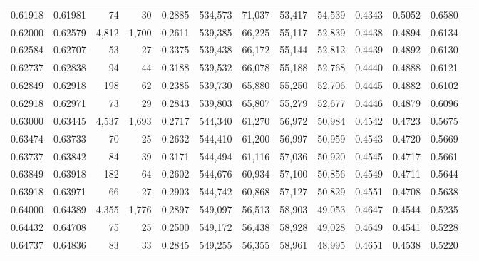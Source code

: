 \begin{tabular}{rrrrrrrrrrrrr}
0.61918 & 0.61981 &     74 &    30 &                                     0.2885 & 534,573 &  71,037 &  53,417 &  54,539 & 0.4343 & 0.5052 & 0.6580 \\
0.62000 & 0.62579 &  4,812 & 1,700 &                                     0.2611 & 539,385 &  66,225 &  55,117 &  52,839 & 0.4438 & 0.4894 & 0.6134 \\
0.62584 & 0.62707 &     53 &    27 &                                     0.3375 & 539,438 &  66,172 &  55,144 &  52,812 & 0.4439 & 0.4892 & 0.6130 \\
0.62737 & 0.62838 &     94 &    44 &                                     0.3188 & 539,532 &  66,078 &  55,188 &  52,768 & 0.4440 & 0.4888 & 0.6121 \\
0.62849 & 0.62918 &    198 &    62 &                                     0.2385 & 539,730 &  65,880 &  55,250 &  52,706 & 0.4445 & 0.4882 & 0.6102 \\
0.62918 & 0.62971 &     73 &    29 &                                     0.2843 & 539,803 &  65,807 &  55,279 &  52,677 & 0.4446 & 0.4879 & 0.6096 \\
0.63000 & 0.63445 &  4,537 & 1,693 &                                     0.2717 & 544,340 &  61,270 &  56,972 &  50,984 & 0.4542 & 0.4723 & 0.5675 \\
0.63474 & 0.63733 &     70 &    25 &                                     0.2632 & 544,410 &  61,200 &  56,997 &  50,959 & 0.4543 & 0.4720 & 0.5669 \\
0.63737 & 0.63842 &     84 &    39 &                                     0.3171 & 544,494 &  61,116 &  57,036 &  50,920 & 0.4545 & 0.4717 & 0.5661 \\
0.63849 & 0.63918 &    182 &    64 &                                     0.2602 & 544,676 &  60,934 &  57,100 &  50,856 & 0.4549 & 0.4711 & 0.5644 \\
0.63918 & 0.63971 &     66 &    27 &                                     0.2903 & 544,742 &  60,868 &  57,127 &  50,829 & 0.4551 & 0.4708 & 0.5638 \\
0.64000 & 0.64389 &  4,355 & 1,776 &                                     0.2897 & 549,097 &  56,513 &  58,903 &  49,053 & 0.4647 & 0.4544 & 0.5235 \\
0.64432 & 0.64708 &     75 &    25 &                                     0.2500 & 549,172 &  56,438 &  58,928 &  49,028 & 0.4649 & 0.4541 & 0.5228 \\
0.64737 & 0.64836 &     83 &    33 &                                     0.2845 & 549,255 &  56,355 &  58,961 &  48,995 & 0.4651 & 0.4538 & 0.5220 \\

\end{tabular}
